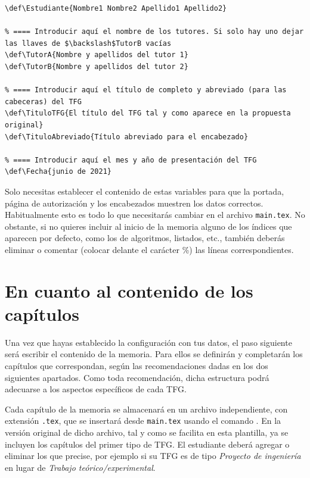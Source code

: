 \begin{lstlisting}[caption={Variables a establecer en \texttt{main.tex}},language={[LaTeX]TeX},label=List.Variables]
% ==== Introducir aquí el nombre del estudiante
\def\Estudiante{Nombre1 Nombre2 Apellido1 Apellido2}

% ==== Introducir aquí el nombre de los tutores. Si solo hay uno dejar las llaves de $\backslash$TutorB vacías
\def\TutorA{Nombre y apellidos del tutor 1}
\def\TutorB{Nombre y apellidos del tutor 2}

% ==== Introducir aquí el título de completo y abreviado (para las cabeceras) del TFG
\def\TituloTFG{El título del TFG tal y como aparece en la propuesta original}
\def\TituloAbreviado{Título abreviado para el encabezado}

% ==== Introducir aquí el mes y año de presentación del TFG
\def\Fecha{junio de 2021}
\end{lstlisting}

Solo necesitas establecer el contenido de estas variables para que la portada, página de autorización y los encabezados muestren los datos correctos. Habitualmente esto es todo lo que necesitarás cambiar en el archivo \texttt{main.tex}. No obstante, si no quieres incluir al inicio de la memoria alguno de los índices que aparecen por defecto, como los de algoritmos, listados, etc., también deberás eliminar o comentar (colocar delante el carácter \%) las líneas correspondientes.

\section{En cuanto al contenido de los capítulos}\label{Sec.CapítulosTFG}

Una vez que hayas establecido la configuración con tus datos, el paso siguiente será escribir el contenido de la memoria. Para ellos se definirán y completarán los capítulos que correspondan, según las recomendaciones dadas en los dos siguientes apartados. Como toda recomendación, dicha estructura podrá adecuarse a los aspectos específicos de cada TFG.

Cada capítulo de la memoria se almacenará en un archivo independiente, con extensión \texttt{.tex}, que se insertará desde \texttt{main.tex} usando el comando \verb||. En la versión original de dicho archivo, tal y como se facilita en esta plantilla, ya se incluyen los capítulos del primer tipo de TFG. El estudiante deberá agregar o eliminar los que precise, por ejemplo si su TFG es de tipo \textit{Proyecto de ingeniería} en lugar de \textit{Trabajo teórico/experimental}.


